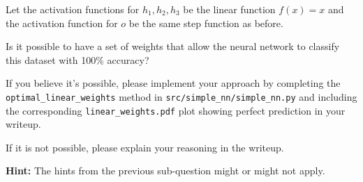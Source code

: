 \item {} Let the activation functions for $h_1, h_2, h_3$ be the linear function $f(x) = x$ and the activation function for $o$ be the same step function as before.

Is it possible to have a set of weights that allow the neural network to classify this dataset with 100\% accuracy?

If you believe it's possible, please implement your approach by completing the \texttt{optimal\_linear\_weights} method in \texttt{src/simple\_nn/simple\_nn.py} and including the corresponding \texttt{linear\_weights.pdf} plot showing perfect prediction in your writeup.

If it is not possible, please explain your reasoning in the writeup.

\textbf{Hint:} The hints from the previous sub-question might or might not apply.

